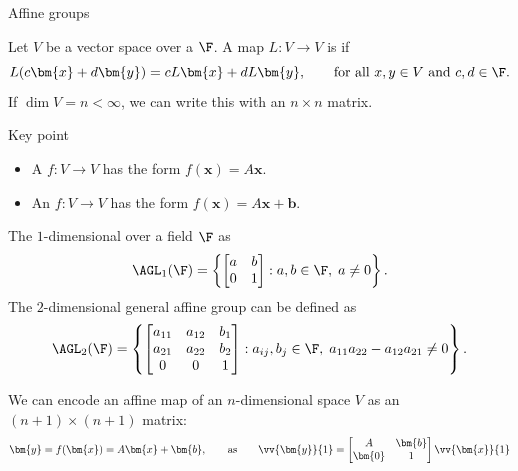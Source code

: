 \documentclass[8pt, handout]{beamer}
\newcommand{\Pause}{}
\begin{document}
\begin{frame}{Affine groups} %

  Let $V$ be a vector space over a $\F$. A map $L\colon V\to V$ is
   if
  \[
  L(c\bm{x}+d\bm{y})=cL\bm{x}+dL\bm{y},\qquad
  \text{for all $x,y\in V$ and $c,d\in\F$}.
  \]
  If $\dim V=n<\infty$, we can write this with an $n\times n$ matrix. \Pause
  
  \begin{exampleblock}{Key point}
    \begin{itemize}
    \item A  $f\colon V\to V$ has the form
      $f(\bm{x})=A\bm{x}$. \smallskip\Pause
    \item An  $f\colon V\to V$ has the form
      $f(\bm{x})=A\bm{x}+\bm{b}$. 
    \end{itemize}
  \end{exampleblock}
  
  \smallskip\Pause
  
  The $1$-dimensional  over a field $\F$ as 
  \[
  \AGL_1(\F)=
  \left\{\begin{bmatrix}a&b\\0&1\end{bmatrix}:a,b\in\F,\;a\neq 0\right\}.
  \]
  The $2$-dimensional general affine group can be defined as
  \[
  \AGL_2(\F)=
  \left\{\begin{bmatrix}a_{11}&a_{12}&b_1\\a_{21}&a_{22}&b_2\\0&0&1\end{bmatrix}
  :a_{ij},b_j\in\F,\;a_{11}a_{22}-a_{12}a_{21}\neq 0\right\}.
  \]
  
  We can encode an affine map of an $n$-dimensional space $V$ as an
  $(n+1)\times(n+1)$ matrix:
  \[
  \bm{y}=f(\bm{x})=A\bm{x}+\bm{b},\qquad\text{as}\qquad 
  \vv{\bm{y}}{1}=\begin{bmatrix} A & \bm{b} \\ \bm{0} & 1 \end{bmatrix}
  \vv{\bm{x}}{1}
  \]
  
\end{frame}

\end{document}
